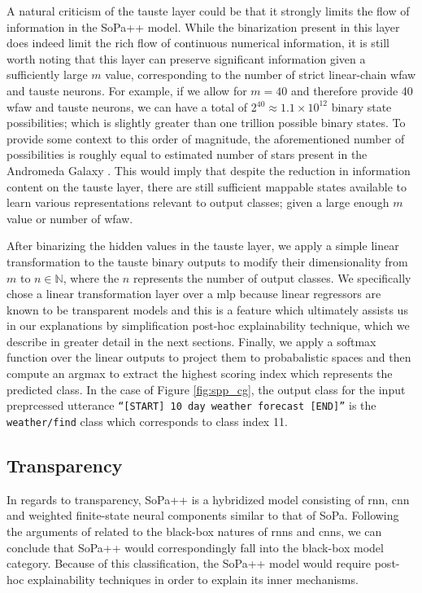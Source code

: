 A natural criticism of the \ac{tauste} layer could be that it strongly limits the
flow of information in the SoPa++ model. While the binarization present in this
layer does indeed limit the rich flow of continuous numerical information, it is
still worth noting that this layer can preserve significant information given a
sufficiently large $m$ value, corresponding to the number of strict linear-chain
\ac{wfaw} and \ac{tauste} neurons. For example, if we allow for $m=40$ and therefore provide 40
\ac{wfaw} and \ac{tauste} neurons, we can have a total of
2$^{40}\approx1.1\times10^{12}$ binary state possibilities; which is slightly
greater than one trillion possible binary states. To provide some context to this
order of magnitude, the aforementioned number of possibilities is roughly equal
to estimated number of stars present in the Andromeda Galaxy
\citep{10.1093/mnras/stu879}. This would imply that despite the reduction in
information content on the \ac{tauste} layer, there are still sufficient mappable
states available to learn various representations relevant to output classes;
given a large enough $m$ value or number of \ac{wfaw}.

After binarizing the hidden values in the \ac{tauste} layer, we apply a simple linear
transformation to the \ac{tauste} binary outputs to modify their dimensionality from
$m$ to $n \in \mathbb{N}$, where the $n$ represents the number of output
classes. We specifically chose a linear transformation layer over a \ac{mlp} because
linear regressors are known to be transparent models
\citep{arrieta2020explainable} and this is a feature which ultimately assists us
in our explanations by simplification post-hoc explainability technique, which
we describe in greater detail in the next sections. Finally, we apply a softmax
function over the linear outputs to project them to probabalistic spaces and
then compute an argmax to extract the highest scoring index which represents the
predicted class. In the case of Figure \ref{fig:spp_cg}, the output class for
the input preprcessed utterance \texttt{``[START] 10 day weather forecast
  [END]''} is the \texttt{weather/find} class which corresponds to class index 11.

\subsection{Transparency}

\label{section:spp_transparency}

In regards to transparency, SoPa++ is a hybridized model consisting of \ac{rnn},
\ac{cnn} and weighted finite-state neural components similar to that of SoPa.
Following the arguments of \citet{arrieta2020explainable} related to the
black-box natures of \ac{rnn}s and \ac{cnn}s, we can conclude that SoPa++ would
correspondingly fall into the black-box model category. Because of this
classification, the SoPa++ model would require post-hoc explainability
techniques in order to explain its inner mechanisms.

